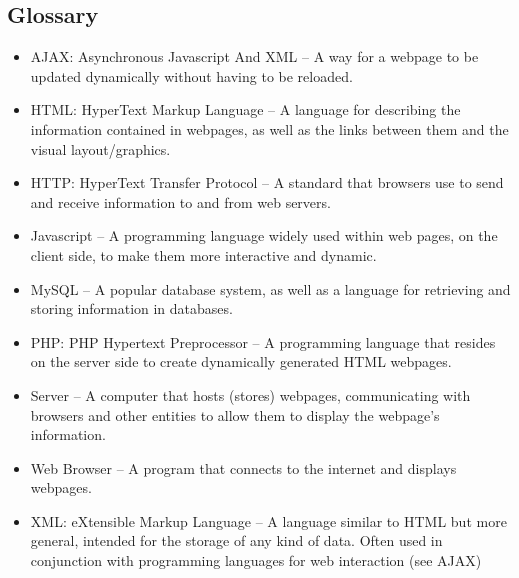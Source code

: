 	\subsection{Glossary}
		\begin{itemize}
			\item AJAX: Asynchronous Javascript And XML – A way for a webpage to be updated dynamically without having to be reloaded.
			\item HTML: HyperText Markup Language – A language for describing the information contained in webpages, as well as the links between them and the visual layout/graphics.
			\item HTTP: HyperText Transfer Protocol – A standard that browsers use to send and receive information to and from web servers.
			\item Javascript – A programming language widely used within web pages, on the client side, to make them more interactive and dynamic.
			\item MySQL – A popular database system, as well as a language for retrieving and storing information in databases.
			\item PHP: PHP Hypertext Preprocessor – A programming language that resides on the server side to create dynamically generated HTML webpages.
			\item Server – A computer that hosts (stores) webpages, communicating with browsers and other entities to allow them to display the webpage's information.
			\item Web Browser – A program that connects to the internet and displays webpages.
			\item XML: eXtensible Markup Language – A language similar to HTML but more general, intended for the storage of any kind of data. Often used in conjunction with programming languages for web interaction (see AJAX)
		\end{itemize}


